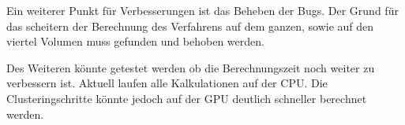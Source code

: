 Ein weiterer Punkt für Verbesserungen ist das Beheben der Bugs. Der Grund für das scheitern der Berechnung des Verfahrens auf dem ganzen, sowie auf den viertel Volumen muss gefunden und behoben werden.


Des Weiteren könnte getestet werden ob die Berechnungszeit noch weiter zu verbessern ist. Aktuell laufen alle Kalkulationen auf der CPU. Die Clusteringschritte könnte jedoch auf der GPU deutlich schneller berechnet werden.


